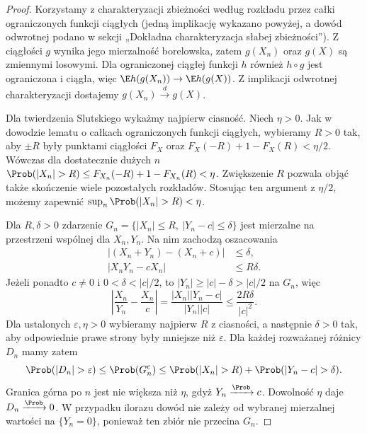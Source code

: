 \begin{proof}
Korzystamy z charakteryzacji zbieżności według rozkładu
przez całki ograniczonych funkcji ciągłych
(jedną implikację wykazano powyżej, a dowód odwrotnej
podano w sekcji „Dokładna charakteryzacja słabej zbieżności”).
Z ciągłości $g$ wynika jego mierzalność borelowska,
zatem $g(X_n)$ oraz $g(X)$ są zmiennymi losowymi.
Dla ograniczonej ciągłej funkcji $h$ również
$h\circ g$ jest ograniczona i ciągła, więc
$\E h(g(X_n))\to\E h(g(X))$.
Z implikacji odwrotnej charakteryzacji dostajemy
$g(X_n)\xrightarrow{d}g(X)$.

Dla twierdzenia Slutskiego wykażmy najpierw ciasność.
Niech $\eta>0$. Jak w dowodzie lematu o całkach
ograniczonych funkcji ciągłych, wybieramy $R>0$
tak, aby $\pm R$ były punktami ciągłości $F_X$ oraz
$F_X(-R)+1-F_X(R)<\eta/2$.
Wówczas dla dostatecznie dużych $n$
$\Prob(|X_n|>R)\leq F_{X_n}(-R)+1-F_{X_n}(R)<\eta$.
Zwiększenie $R$ pozwala objąć także skończenie wiele
pozostałych rozkładów. Stosując ten argument z $\eta/2$,
możemy zapewnić $\sup_n\Prob(|X_n|>R)<\eta$.

Dla $R,\delta>0$ zdarzenie
$G_n=\{|X_n|\leq R,\ |Y_n-c|\leq\delta\}$
jest mierzalne na przestrzeni wspólnej dla $X_n,Y_n$.
Na nim zachodzą oszacowania
\[
\begin{aligned}
|(X_n+Y_n)-(X_n+c)|&\leq\delta,\\
|X_nY_n-cX_n|&\leq R\delta.
\end{aligned}
\]
Jeżeli ponadto $c\ne0$ i $0<\delta<|c|/2$,
to $|Y_n|\geq |c|-\delta>|c|/2$ na $G_n$, więc
\[
\left|\frac{X_n}{Y_n}-\frac{X_n}{c}\right|
=\frac{|X_n||Y_n-c|}{|Y_n||c|}
\leq\frac{2R\delta}{|c|^2}.
\]
Dla ustalonych $\varepsilon,\eta>0$ wybieramy najpierw
$R$ z ciasności, a następnie $\delta>0$ tak, aby
odpowiednie prawe strony były mniejsze niż $\varepsilon$.
Dla każdej rozważanej różnicy $D_n$ mamy zatem
\[
\Prob(|D_n|>\varepsilon)
\leq\Prob(G_n^c)
\leq\Prob(|X_n|>R)+\Prob(|Y_n-c|>\delta).
\]
Granica górna po $n$ jest nie większa niż $\eta$,
gdyż $Y_n\xrightarrow{\Prob}c$.
Dowolność $\eta$ daje $D_n\xrightarrow{\Prob}0$.
W przypadku ilorazu dowód nie zależy od wybranej
mierzalnej wartości na $\{Y_n=0\}$, ponieważ ten
zbiór nie przecina $G_n$.


\end{proof}
